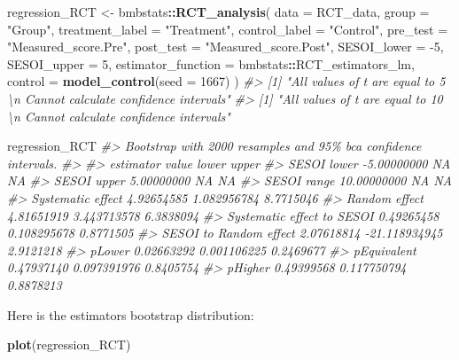 \documentclass[
]{book}
\newenvironment{Shaded}{\begin{snugshade}}{\end{snugshade}}
\newcommand{\CommentTok}[1]{\textcolor[rgb]{0.56,0.35,0.01}{\textit{#1}}}
\newcommand{\DataTypeTok}[1]{\textcolor[rgb]{0.13,0.29,0.53}{#1}}
\newcommand{\DecValTok}[1]{\textcolor[rgb]{0.00,0.00,0.81}{#1}}
\newcommand{\KeywordTok}[1]{\textcolor[rgb]{0.13,0.29,0.53}{\textbf{#1}}}
\newcommand{\NormalTok}[1]{#1}
\newcommand{\OperatorTok}[1]{\textcolor[rgb]{0.81,0.36,0.00}{\textbf{#1}}}
\newcommand{\StringTok}[1]{\textcolor[rgb]{0.31,0.60,0.02}{#1}}
\begin{document}
\begin{Shaded}
\begin{Highlighting}[]
\NormalTok{regression\_RCT <{-}}\StringTok{ }\NormalTok{bmbstats}\OperatorTok{::}\KeywordTok{RCT\_analysis}\NormalTok{(}
  \DataTypeTok{data =}\NormalTok{ RCT\_data,}
  \DataTypeTok{group =} \StringTok{"Group"}\NormalTok{,}
  \DataTypeTok{treatment\_label =} \StringTok{"Treatment"}\NormalTok{,}
  \DataTypeTok{control\_label =} \StringTok{"Control"}\NormalTok{,}
  \DataTypeTok{pre\_test =} \StringTok{"Measured\_score.Pre"}\NormalTok{,}
  \DataTypeTok{post\_test =} \StringTok{"Measured\_score.Post"}\NormalTok{,}
  \DataTypeTok{SESOI\_lower =} \DecValTok{{-}5}\NormalTok{,}
  \DataTypeTok{SESOI\_upper =} \DecValTok{5}\NormalTok{,}
  \DataTypeTok{estimator\_function =}\NormalTok{ bmbstats}\OperatorTok{::}\NormalTok{RCT\_estimators\_lm,}
  \DataTypeTok{control =} \KeywordTok{model\_control}\NormalTok{(}\DataTypeTok{seed =} \DecValTok{1667}\NormalTok{)}
\NormalTok{)}
\CommentTok{\#> [1] "All values of t are equal to  5 \textbackslash{}n Cannot calculate confidence intervals"}
\CommentTok{\#> [1] "All values of t are equal to  10 \textbackslash{}n Cannot calculate confidence intervals"}


\NormalTok{regression\_RCT}
\CommentTok{\#> Bootstrap with 2000 resamples and 95\% bca confidence intervals.}
\CommentTok{\#> }
\CommentTok{\#>                   estimator       value         lower     upper}
\CommentTok{\#>                 SESOI lower {-}5.00000000            NA        NA}
\CommentTok{\#>                 SESOI upper  5.00000000            NA        NA}
\CommentTok{\#>                 SESOI range 10.00000000            NA        NA}
\CommentTok{\#>           Systematic effect  4.92654585   1.082956784 8.7715046}
\CommentTok{\#>               Random effect  4.81651919   3.443713578 6.3838094}
\CommentTok{\#>  Systematic effect to SESOI  0.49265458   0.108295678 0.8771505}
\CommentTok{\#>      SESOI to Random effect  2.07618814 {-}21.118934945 2.9121218}
\CommentTok{\#>                      pLower  0.02663292   0.001106225 0.2469677}
\CommentTok{\#>                 pEquivalent  0.47937140   0.097391976 0.8405754}
\CommentTok{\#>                     pHigher  0.49399568   0.117750794 0.8878213}
\end{Highlighting}
\end{Shaded}

Here is the estimators bootstrap distribution:

\begin{Shaded}
\begin{Highlighting}[]
\KeywordTok{plot}\NormalTok{(regression\_RCT)}
\end{Highlighting}
\end{Shaded}
\end{document}
